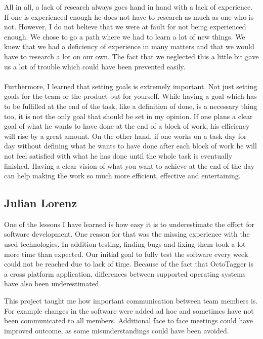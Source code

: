 All in all, a lack of research always goes hand in hand with a lack of
experience. If one is experienced enough he does not have to research as much as
one who is not. However, I do not believe that we were at fault for not being
experienced enough. We chose to go a path where we had to learn a lot
of new things. We knew that we had a deficiency of experience in many matters
and that we would have to research a lot on our own. The fact that we neglected
this a little bit gave us a lot of trouble which could have been prevented
easily.

\paragraph{}
Furthermore, I learned that setting goals is extremely important. Not just
setting goals for the team or the product but for yourself. While having a goal
which has to be fulfilled at the end of the task, like a definition of done, is
a necessary thing too, it is not the only goal that should be set in my opinion.
If one plans a clear goal of what he wants to have done at the end of a block of
work, his efficiency will rise by a great amount. On the other hand, if one
works on a task day for day without defining what he wants to have done after each
block of work he will not feel satisfied with what he has done until the whole
task is eventually finished. Having a clear vision of what you want to achieve
at the end of the day can help making the work so much more efficient, effective
and entertaining.

\subsection{Julian Lorenz}

One of the lessons I have learned is how easy it is to underestimate the effort for software development. One reason for that was the missing experience with the used technologies. In addition testing, finding bugs and fixing them took a lot more time than expected. Our initial goal to fully test the software every week could not be reached due to lack of time. Because of the fact that OctoTagger is a cross platform application, differences between supported operating systems have also been underestimated.

This project taught me how important communication between team members is. For example changes in the software were added ad hoc and sometimes have not been communicated to all members. Additional face to face meetings could have improved outcome, as some misunderstandings could have been avoided.

